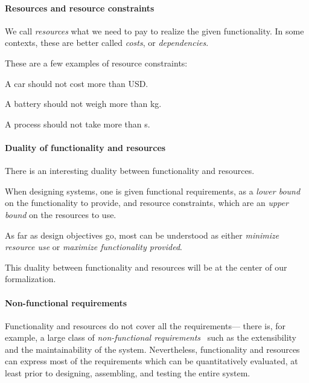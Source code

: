 \paragraph{Resources and resource constraints}

We call \emph{resources} what we need to pay to realize the given functionality.
In some contexts, these are better called \emph{costs}, or \emph{dependencies}.


\begin{example}
These are a few examples of resource constraints:
\begin{compactitem}
\item A car should not cost more than \unit[15000]{USD}.
\item A battery should not weigh more than \unit[1]{kg}.
\item A process should not take more than \unit[10]{s}.
\end{compactitem}
\end{example}

\paragraph{Duality of functionality and resources}

There is an interesting duality between functionality and resources.

When designing systems, one is given functional requirements, as a \emph{lower bound} on the
functionality to provide, and  resource constraints, which are an \emph{upper bound} on the
resources to use.

As far as design objectives go, most can be understood as either \emph{minimize resource use}
or \emph{maximize functionality provided}.

This duality between functionality and resources will be at the
center of our formalization.

\paragraph{Non-functional requirements}

Functionality and resources do not cover all the requirements--- there is, for example, a
large class of \emph{non-functional requirements}~\cite{olly} such as the extensibility and the
maintainability of the system. Nevertheless, functionality and resources can express most of
the requirements which can be quantitatively evaluated, at least prior to designing, assembling,
and testing the entire system.

